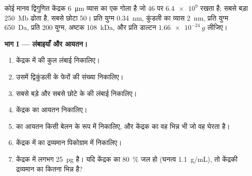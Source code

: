 \begin{problem}
\label{pb:b1:genomes:1}
कोई मानव द्विगुणित केंद्रक \qty{6}{\micro m} व्यास का एक गोला है जो
46  पर $\num{6.4e9}$  रखता है; सबसे बड़ा
 \qty{250}{Mb} ढोता है, सबसे छोटा \qty{50}{}।
प्रति युग्म \qty{0.34}{nm}, कुंडली का व्यास \qty{2}{nm},
प्रति युग्म \qty{650}{Da}, प्रति  \num{200} युग्म, 
अष्टक \qty{108}{kDa}, और प्रति डाल्टन $\qty{1.66e-24}{g}$ लीजिए।

\medskip
\noindent\textbf{भाग I --- लंबाइयाँ और आयतन।}
\begin{enumerate}
  \item केंद्रक में  की कुल लंबाई निकालिए।
  \item उसमें द्विकुंडली के फेरों की संख्या निकालिए।
  \item सबसे बड़े और सबसे छोटे  के  की लंबाई निकालिए।
  \item केंद्रक का आयतन निकालिए।
  \item {} का आयतन किसी बेलन के रूप में निकालिए, और केंद्रक का वह
        भिन्न भी जो वह घेरता है।
  \item केंद्रक में  का द्रव्यमान पिकोग्राम में निकालिए।
  \item केंद्रक में लगभग \qty{25}{pg}  है। यदि केंद्रक का
        \qty{80}{\%} जल हो (घनत्व \qty{1.1}{g/mL}), तो केंद्रकी
        द्रव्यमान का कितना भिन्न  है?
\end{enumerate}


\end{problem}
